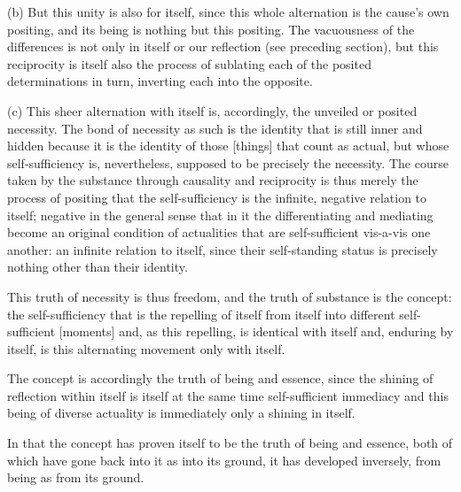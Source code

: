 (b) But this unity is also for itself,
since this whole alternation is the cause's own positing,
and its being is nothing but this positing.
The vacuousness of the differences is not only
in itself or our reflection (see preceding section),
but this reciprocity is itself also the process of sublating
each of the posited determinations in turn,
inverting each into the opposite.

(c) This sheer alternation with itself is, accordingly,
the unveiled or posited necessity.
The bond of necessity as such is
the identity that is still inner and hidden
because it is the identity of
those [things] that count as actual,
but whose self-sufficiency is, nevertheless,
supposed to be precisely the necessity.
The course taken by the substance through
causality and reciprocity is thus merely
the process of positing that the self-sufficiency is
the infinite, negative relation to itself;
negative in the general sense that in it
the differentiating and mediating become an
original condition of actualities that are
self-sufficient vis-a-vis one another:
an infinite relation to itself, since their self-standing
status is precisely nothing other than their identity.

This truth of necessity is thus freedom, and
the truth of substance is the concept:
the self-sufficiency that is the repelling of itself from itself into
different self-sufficient [moments] and, as this repelling, is
identical with itself and, enduring by itself, is
this alternating movement only with itself.

The concept is accordingly the truth of being and essence,
since the shining of reflection within itself is
itself at the same time self-sufficient immediacy
and this being of diverse actuality is immediately
only a shining in itself.

    In that the concept has proven itself to be
    the truth of being and essence,
    both of which have gone back into it
    as into its ground, it has developed inversely,
    from being as from its ground.

